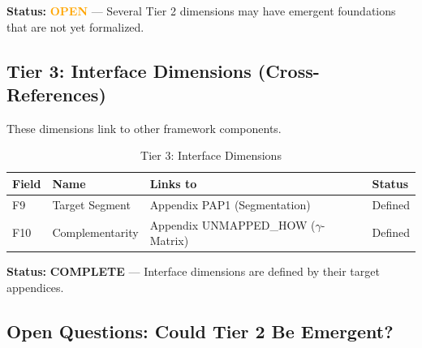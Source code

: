 \textbf{Status:} \textcolor{orange}{\textbf{OPEN}} --- Several Tier 2 dimensions may have emergent foundations that are not yet formalized.

\subsection{Tier 3: Interface Dimensions (Cross-References)}

These dimensions link to other framework components.

\begin{table}[htbp]
\centering
\caption{Tier 3: Interface Dimensions}
\label{tab:hhh-tier3}
\renewcommand{\arraystretch}{1.3}
\begin{tabular}{@{}llll@{}}
\toprule
\textbf{Field} & \textbf{Name} & \textbf{Links to} & \textbf{Status} \\
\midrule
F9 & Target Segment & Appendix PAP1 (Segmentation) & \textcolor{green!60!black}{Defined} \\
F10 & Complementarity & Appendix UNMAPPED_HOW ($\gamma$-Matrix) & \textcolor{green!60!black}{Defined} \\
\bottomrule
\end{tabular}
\end{table}

\textbf{Status:} \textcolor{green!60!black}{\textbf{COMPLETE}} --- Interface dimensions are defined by their target appendices.

\subsection{Open Questions: Could Tier 2 Be Emergent?}

